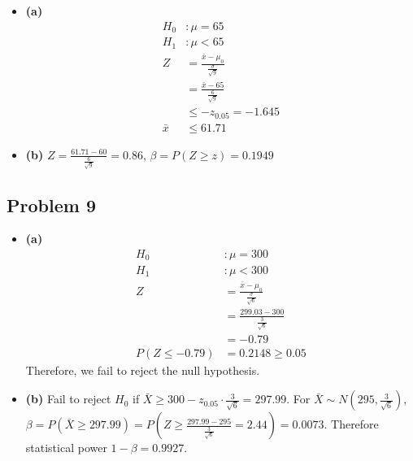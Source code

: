 \documentclass{article}
\begin{document}
\begin{itemize}
	\item \textbf{(a)}
		\begin{align*}
			H_0&: \mu = 65 \\
			H_1&: \mu < 65 \\
			Z &= \frac{\bar{x} - \mu_0}{\frac{\sigma}{\sqrt{9}}} \\
			&= \frac{\bar{x} - 65}{\frac{6}{\sqrt{9}}} \\
			&\le -z_{0.05} = -1.645 \\
			\bar{x} &\le 61.71
		\end{align*}
	\item \textbf{(b)} $Z = \frac{61.71 - 60}{\frac{6}{\sqrt{9}}} = 0.86$, $\beta = P(Z \ge z) = 0.1949$
\end{itemize}

\subsection*{Problem 9}

\begin{itemize}
	\item \textbf{(a)}
		\begin{align*}
			H_0&: \mu = 300 \\
			H_1&: \mu < 300 \\
			Z &= \frac{\bar{x} - \mu_0}{\frac{\sigma}{\sqrt{6}}} \\
			&= \frac{299.03 - 300}{\frac{3}{\sqrt{6}}} \\
			&= -0.79 \\
			P(Z \le -0.79) &= 0.2148 \ge 0.05
		\end{align*}
		Therefore, we fail to reject the null hypothesis.
	\item \textbf{(b)}
		Fail to reject $H_0$ if $\bar{X} \ge 300 - z_{0.05} \cdot \frac{3}{\sqrt{6}} = 297.99$.
		For $\bar{X} \sim N(295, \frac{3}{\sqrt{6}})$,
		$\beta = P(\bar{X} \ge 297.99) = P(Z \ge \frac{297.99 - 295}{\frac{3}{\sqrt{6}}} = 2.44) = 0.0073$. Therefore statistical power $1-\beta = 0.9927$.
\end{itemize}
\end{document}
